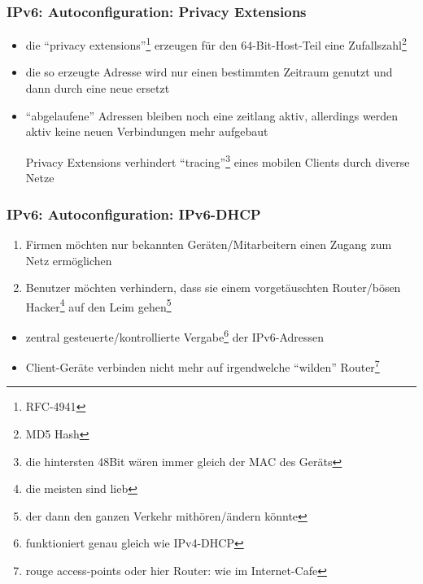 \documentclass[ignorenonframetext]{beamer}
\begin{document}
\begin{frame}
\frametitle{IPv6: Autoconfiguration: Privacy Extensions}
\begin{itemize}
  \item die ``privacy extensions''\footnote{RFC-4941} erzeugen f\"ur den 64-Bit-Host-Teil eine Zufallszahl\footnote{MD5 Hash}
  \item die so erzeugte Adresse wird nur einen bestimmten Zeitraum genutzt und dann durch eine neue ersetzt
  \item ``abgelaufene'' Adressen bleiben noch eine zeitlang aktiv, allerdings werden aktiv keine neuen Verbindungen mehr aufgebaut
\begin{block}{Privacy Extensions}
verhindert ``tracing''\footnote{die hintersten 48Bit w\"aren immer gleich der MAC des Ger\"ats} eines mobilen Clients durch diverse Netze
\end{block}
\end{itemize}
\end{frame}

\begin{frame}
\frametitle{IPv6: Autoconfiguration: IPv6-DHCP}
\begin{enumerate}
	\item Firmen m\"ochten nur bekannten Ger\"aten/Mitarbeitern einen Zugang zum Netz erm\"oglichen
	\item Benutzer m\"ochten verhindern, dass sie einem vorget\"auschten Router/b\"osen Hacker\footnote{die meisten sind lieb} auf den Leim gehen\footnote{der dann den ganzen Verkehr mith\"oren/\"andern k\"onnte}
\end{enumerate}
\begin{itemize}
  \item zentral gesteuerte/kontrollierte Vergabe\footnote{funktioniert genau gleich wie IPv4-DHCP} der IPv6-Adressen
  \item Client-Ger\"ate verbinden nicht mehr auf irgendwelche ``wilden'' Router\footnote{rouge access-points oder hier Router: wie im Internet-Cafe}
\end{itemize}
\end{frame}
\end{document}
